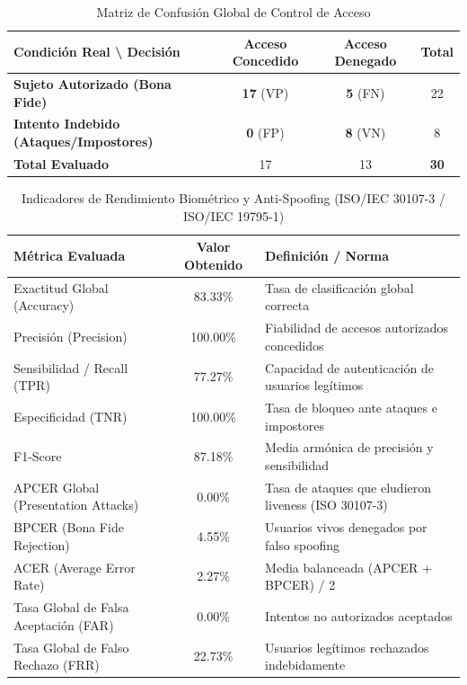 
\begin{table}[htbp]
\centering
\caption{Matriz de Confusión Global de Control de Acceso}
\label{tab:matriz_confusion}
\begin{tabular}{l|c|c|c}
\hline
\textbf{Condición Real \textbackslash{} Decisión} & \textbf{Acceso Concedido} & \textbf{Acceso Denegado} & \textbf{Total} \\ \hline
\textbf{Sujeto Autorizado (Bona Fide)} & \textbf{17} (VP) & \textbf{5} (FN) & 22 \\ \hline
\textbf{Intento Indebido (Ataques/Impostores)} & \textbf{0} (FP) & \textbf{8} (VN) & 8 \\ \hline
\textbf{Total Evaluado} & 17 & 13 & \textbf{30} \\ \hline
\end{tabular}
\end{table}

\begin{table}[htbp]
\centering
\caption{Indicadores de Rendimiento Biométrico y Anti-Spoofing (ISO/IEC 30107-3 / ISO/IEC 19795-1)}
\label{tab:metricas_biometricas}
\begin{tabular}{l|c|l}
\hline
\textbf{Métrica Evaluada} & \textbf{Valor Obtenido} & \textbf{Definición / Norma} \\ \hline
Exactitud Global (Accuracy) & 83.33\% & Tasa de clasificación global correcta \\
Precisión (Precision) & 100.00\% & Fiabilidad de accesos autorizados concedidos \\
Sensibilidad / Recall (TPR) & 77.27\% & Capacidad de autenticación de usuarios legítimos \\
Especificidad (TNR) & 100.00\% & Tasa de bloqueo ante ataques e impostores \\
F1-Score & 87.18\% & Media armónica de precisión y sensibilidad \\
APCER Global (Presentation Attacks) & 0.00\% & Tasa de ataques que eludieron liveness (ISO 30107-3) \\
BPCER (Bona Fide Rejection) & 4.55\% & Usuarios vivos denegados por falso spoofing \\
ACER (Average Error Rate) & 2.27\% & Media balanceada (APCER + BPCER) / 2 \\
Tasa Global de Falsa Aceptación (FAR) & 0.00\% & Intentos no autorizados aceptados \\
Tasa Global de Falso Rechazo (FRR) & 22.73\% & Usuarios legítimos rechazados indebidamente \\ \hline
\end{tabular}
\end{table}

